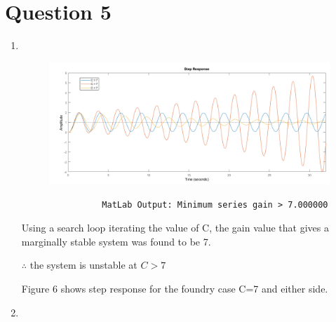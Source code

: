 \documentclass[a4paper,11pt]{article}
\begin{document}
\section*{Question 5}
\begin{enumerate}[label=\alph*)]
        \item  
        \begin{figure}[h]
                \centering
                        \includegraphics[width=\linewidth]
                        {inc/q5a}
                \caption{}
        \end{figure} 
        \begin{verbatim}
                MatLab Output: Minimum series gain > 7.000000
        \end{verbatim}

Using a search loop iterating the value of C, the gain value that gives a marginally stable system was found to be 7. 

$\therefore$ the system is unstable at $C > 7$

Figure 6 shows step response for the foundry case C=7 and either side.

        \item  
        \begin{figure}[h]
                \centering
                \caption{}
        \end{figure} 
\end{enumerate}
\end{document}
